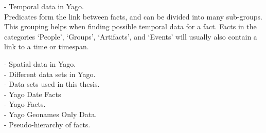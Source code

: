 - Temporal data in Yago.\\
Predicates form the link between facts, and can be divided into many sub-groups. This grouping helps when finding possible temporal data for a fact. Facts in the categories `People', `Groups', `Artifacts', and `Events' will usually also contain a link to a time or timespan.

- Spatial data in Yago.\\


- Different data sets in Yago.\\
- Data sets used in this thesis.\\
	- Yago Date Facts\\
	- Yago Facts.\\
	- Yago Geonames Only Data.\\
- Pseudo-hierarchy of facts.\\

\clearpage